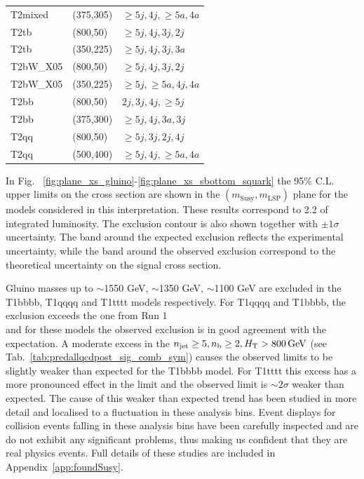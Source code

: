 \begin{table}[h!]
\begin{tabular}{ lll }
    T2mixed & (375,305) & $\geq5j,4j,\geq5a,4a$ \\
    T2tb & (800,50) & $\geq5j,4j,3j,2j$ \\
    T2tb & (350,225) & $\geq5j,4j,3j,3a$ \\
    T2bW\_X05 & (800,50) & $\geq5j,4j,3j,2j$ \\
    T2bW\_X05 & (350,225) & $\geq5j,\geq5a,4j,4a$ \\
    T2bb & (800,50) & $2j,3j,4j,\geq5j$ \\
    T2bb & (375,300) & $\geq5j,4j,3a,3j$ \\
    T2qq & (800,50) & $\geq5j,3j,2j,4j$ \\
    T2qq & (500,400) & $\geq5j,4j,\geq5a,4a$ \\
    \hline
    \hline
  \end{tabular}
\end{table}

In Fig. ~\ref{fig:plane_xs_gluino}-\ref{fig:plane_xs_sbottom_squark} the 95\% C.L. upper limits on the cross section are shown 
in the $(m_{\mathrm{Susy}},m_{\mathrm{LSP}})$ plane for the models considered in this interpretation. 
These results correspond to 2.2 \ifb of integrated luminosity. 
The exclusion contour is also shown together with $\pm1\sigma$ uncertainty. 
The band around the expected exclusion reflects the experimental uncertainty, 
while the band around the observed exclusion correspond to the theoretical 
uncertainty on the signal cross section.

Gluino masses up to $\sim$1550 GeV, $\sim$1350 GeV, $\sim$1100 GeV are excluded in the T1bbbb, 
T1qqqq and T1tttt models respectively. 
For T1qqqq and T1bbbb, the exclusion exceeds the one from Run 1 \\
and for these models the observed exclusion is in good agreement with the expectation. 
A moderate excess in the $n_{\text{jet}}\geq5, n_{\text{b}}\geq2, \mbox{$H_\text{T}$} > 800 \, \mathrm{GeV}$ (see Tab.~\ref{tab:predallqcdpost_sig_comb_sym})
causes the observed limits to be slightly weaker than expected for the T1bbbb model. 
For T1tttt this excess has a more pronounced effect in the limit and the observed limit is $\sim 2\sigma$ 
weaker than expected. The cause of this weaker than expected trend has been studied in more detail
and localised to a fluctuation in these analysis bins. Event displays for collision events 
falling in these analysis bins have been carefully inspected and are do not exhibit any 
significant problems, thus making us confident that they are real physics events. Full details
of these studies are included in Appendix~\ref{app:foundSusy}.

